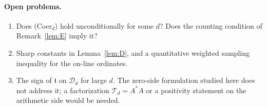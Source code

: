 \documentclass[11pt]{amsart}
\theoremstyle{definition}
\theoremstyle{remark}
\newcommand{\tform}{\mathfrak t}
\newcommand{\Top}{\mathcal T}
\begin{document}
\paragraph{Open problems.}
\begin{enumerate}[label=\textbf{\arabic*.}]
\item Does (Coer$_d$) hold unconditionally for some $d$? Does the counting condition of
Remark~\ref{lem:E} imply it?
\item Sharp constants in Lemma~\ref{lem:D}, and a quantitative weighted sampling inequality
for the on-line ordinates.
\item The sign of $\tform$ on $\mathcal D_d$ for large $d$. The zero-side formulation
studied here does not address it; a factorization $\Top_d=A^{*}A$ or a positivity
statement on the arithmetic side would be needed.
\end{enumerate}
\end{document}
